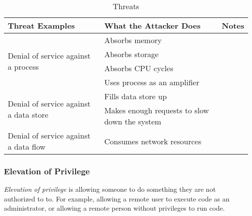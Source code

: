 \begin{table}[h!]
  \centering
  \begin{tabular}{p{5.7cm}p{5.7cm}p{5.7cm}}
    \toprule
    Threat Examples & What the Attacker Does & Notes \\
    \midrule
    \multirow{4}{5.7cm}{Denial of service against a process} & Absorbs memory & \\ \cline{2-3}
                    & Absorbs storage & \\ \cline{2-3}
                    & Absorbs CPU cycles & \\ \cline{2-3}
                    & Uses process as an amplifier & \\
    \midrule
    \multirow{2}{5.7cm}{Denial of service against a data store} & Fills data store up & \\ \cline{2-3}
                    & Makes enough requests to slow down the system & \\
    \midrule
    \multirow{1}{5.7cm}{Denial of service against a data flow} & Consumes network resources & \\
    \bottomrule
  \end{tabular}
  \caption{ Threats}
  \label{tab:Denial_of_Service_Threats}
\end{table}

\subsubsection{Elevation of Privilege}\label{subsubsec:Elevation_of_Privilege}
\begin{definition}\label{def:Elevation_of_Privilege}
  \emph{Elevation of privilege} is allowing someone to do something they are not authorized to to.
  For example, allowing a remote user to execute code as an administrator, or allowing a remote person without privileges to run code.
\end{definition}

